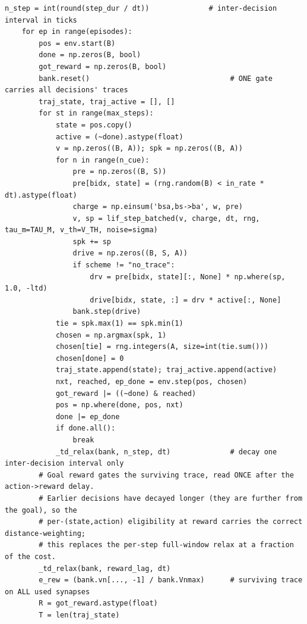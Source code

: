 \begin{lstlisting}[caption={mrl\_trace/extensions.py},label={lst:siox-src-extensions}]
    n_step = int(round(step_dur / dt))              # inter-decision interval in ticks
    for ep in range(episodes):
        pos = env.start(B)
        done = np.zeros(B, bool)
        got_reward = np.zeros(B, bool)
        bank.reset()                                 # ONE gate carries all decisions' traces
        traj_state, traj_active = [], []
        for st in range(max_steps):
            state = pos.copy()
            active = (~done).astype(float)
            v = np.zeros((B, A)); spk = np.zeros((B, A))
            for n in range(n_cue):
                pre = np.zeros((B, S))
                pre[bidx, state] = (rng.random(B) < in_rate * dt).astype(float)
                charge = np.einsum('bsa,bs->ba', w, pre)
                v, sp = lif_step_batched(v, charge, dt, rng, tau_m=TAU_M, v_th=V_TH, noise=sigma)
                spk += sp
                drive = np.zeros((B, S, A))
                if scheme != "no_trace":
                    drv = pre[bidx, state][:, None] * np.where(sp, 1.0, -ltd)
                    drive[bidx, state, :] = drv * active[:, None]
                bank.step(drive)
            tie = spk.max(1) == spk.min(1)
            chosen = np.argmax(spk, 1)
            chosen[tie] = rng.integers(A, size=int(tie.sum()))
            chosen[done] = 0
            traj_state.append(state); traj_active.append(active)
            nxt, reached, ep_done = env.step(pos, chosen)
            got_reward |= ((~done) & reached)
            pos = np.where(done, pos, nxt)
            done |= ep_done
            if done.all():
                break
            _td_relax(bank, n_step, dt)              # decay one inter-decision interval only
        # Goal reward gates the surviving trace, read ONCE after the action->reward delay.
        # Earlier decisions have decayed longer (they are further from the goal), so the
        # per-(state,action) eligibility at reward carries the correct distance-weighting;
        # this replaces the per-step full-window relax at a fraction of the cost.
        _td_relax(bank, reward_lag, dt)
        e_rew = (bank.vn[..., -1] / bank.Vnmax)      # surviving trace on ALL used synapses
        R = got_reward.astype(float)
        T = len(traj_state)


\end{lstlisting}
